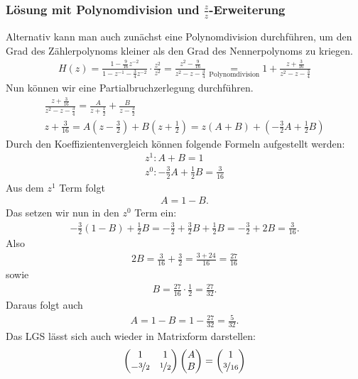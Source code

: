 \documentclass[11pt,a4paper,DIV=12]{scrartcl}
\begin{document}
\subsubsection*{Lösung mit Polynomdivision und $\frac{z}{z}$-Erweiterung}
%
Alternativ kann man auch zunächst eine Polynomdivision durchführen,
um den Grad des Zählerpolynoms kleiner als den Grad des Nennerpolynoms
zu kriegen.
%
\begin{gather}
	H(z)=
	\frac{1-\frac{9}{16}z^{-2}}{1-z^{-1}-\frac{3}{4}z^{-2}}\cdot\frac{z^2}{z^2}
	=\frac{z^2-\frac{9}{16}}{z^2-z-\frac{3}{4}}
	\underset{\text{Polynomdivision}}{=}1+\frac{z+\frac{3}{16}}{z^2-z-\frac{3}{4}}
\end{gather}
%
Nun können wir eine Partialbruchzerlegung durchführen.
%
\begin{gather}
	\frac{z+\frac{3}{16}}{z^2-z-\frac{3}{4}}=\frac{A}{z+\frac{1}{2}}+\frac{B}{z-\frac{3}{2}}\\
	z+\frac{3}{16}=A\left(z-\frac{3}{2}\right)+B\left(z+\frac{1}{2}\right)=z\left(A+B\right)+\left(-\frac{3}{2}A+\frac{1}{2}B\right)
\end{gather}
%
Durch den Koeffizientenvergleich können folgende Formeln aufgestellt werden:
%
\begin{gather}
	z^1: A+B=1\\
	z^0: -\frac{3}{2}A+\frac{1}{2}B=\frac{3}{16}
\end{gather}
%
Aus dem $z^1$ Term folgt
%
\begin{gather}
	A=1-B.
\end{gather}
%
Das setzen wir nun in den $z^0$ Term ein:
%
\begin{gather}
	-\frac{3}{2}(1-B)+\frac{1}{2}B=-\frac{3}{2}+\frac{3}{2}B+\frac{1}{2}B=-\frac{3}{2}+2B=\frac{3}{16}.
\end{gather}
%
Also
%
\begin{gather}
	2B=\frac{3}{16}+\frac{3}{2}=\frac{3+24}{16}=\frac{27}{16}
\end{gather}
%
sowie
%
\begin{gather}
	B=\frac{27}{16}\cdot\frac{1}{2}=\frac{27}{32}.
\end{gather}
%
Daraus folgt auch
%
\begin{gather}
	A=1-B=1-\frac{27}{32}=\frac{5}{32}.
\end{gather}
%
Das LGS lässt sich auch wieder in Matrixform darstellen:
%
\begin{gather}
	\begin{pmatrix}
		1 & 1\\
		-\nicefrac{3}{2} & \nicefrac{1}{2}
	\end{pmatrix}
	\begin{pmatrix}
		A \\
		B
	\end{pmatrix}
	=
	\begin{pmatrix}
		1 \\
		\nicefrac{3}{16}
	\end{pmatrix}
\end{gather}
\end{document}
